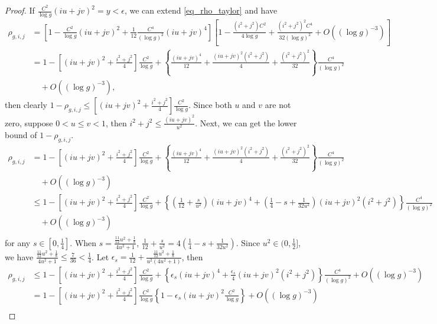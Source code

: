 \documentclass{article}
\begin{document}
\begin{appendices}
\begin{proof}
		If $\frac{C^2}{\log g}(iu+jv)^2=y<\epsilon$, we can extend \ref{eq_rho_taylor} and have
		\begin{equation*}
			\begin{aligned}
				\rho_{g,i,j}&= [1-\frac{C^2}{\log g}(iu+jv)^2+\frac{1}{12}\frac{C^4}{(\log g)^2}(iu+jv)^4][1-\frac{(i^2+j^2)C^2}{4\log g}+\frac{(i^2+j^2)^2C^4}{32(\log g)^2}+O((\log g)^{-3})]\\
				&=1-[(iu+jv)^2+\frac{i^2+j^2}{4}]\frac{C^2}{\log g}+\left\{\frac{(iu+jv)^4}{12}+\frac{(iu+jv)^2(i^2+j^2)}{4}+\frac{(i^2+j^2)^2}{32}\right\}\frac{C^4}{(\log g)^2}\\
				&\quad+O((\log g)^{-3}),
			\end{aligned}
		\end{equation*}
		then clearly $1-\rho_{g,i,j}\leq[(iu+jv)^2+\frac{i^2+j^2}{4}]\frac{C^2}{\log g}$. Since both $u$ and $v$ are not zero, suppose $0<u\leq v<1$, then $i^2+j^2\leq\frac{(iu+jv)^2}{u^2}$. Next, we can get the lower bound of $1-\rho_{g,i,j}$.
		\begin{equation*}
			\begin{aligned}
				\rho_{g,i,j}&=1-[(iu+jv)^2+\frac{i^2+j^2}{4}]\frac{C^2}{\log g}+\left\{\frac{(iu+jv)^4}{12}+\frac{(iu+jv)^2(i^2+j^2)}{4}+\frac{(i^2+j^2)^2}{32}\right\}\frac{C^4}{(\log g)^2}\\
				&\quad+O((\log g)^{-3})\\
				&\leq1-[(iu+jv)^2+\frac{i^2+j^2}{4}]\frac{C^2}{\log g}+\left\{(\frac{1}{12}+\frac{s}{u^2})(iu+jv)^4+(\frac{1}{4}-s+\frac{1}{32u^2})(iu+jv)^2(i^2+j^2)\right\}\frac{C^4}{(\log g)^2}\\
				&\quad+O((\log g)^{-3})\\
			\end{aligned}
		\end{equation*}
		for any $s\in[0,\frac{1}{4}]$. When $s=\frac{\frac{11}{12}u^2+\frac{1}{8}}{4u^2+1}$, $\frac{1}{12}+\frac{s}{u^2}=4(\frac{1}{4}-s+\frac{1}{32u^2})$. Since $u^2\in(0,\frac{1}{2}]$, we have $\frac{\frac{11}{12}u^2+\frac{1}{8}}{4u^2+1}\leq\frac{7}{36}<\frac{1}{4}$. Let $\epsilon_s=\frac{1}{12}+\frac{\frac{11}{12}u^2+\frac{1}{8}}{u^2(4u^2+1)}$, then
		\begin{equation*}
			\begin{aligned}
				\rho_{g,i,j} &\leq1-[(iu+jv)^2+\frac{i^2+j^2}{4}]\frac{C^2}{\log g}+\left\{\epsilon_s(iu+jv)^4+\frac{\epsilon_s}{4}(iu+jv)^2(i^2+j^2)\right\}\frac{C^4}{(\log g)^2}+O((\log g)^{-3})\\
				&=1-[(iu+jv)^2+\frac{i^2+j^2}{4}]\frac{C^2}{\log g}\left\{1-\epsilon_s(iu+jv)^2\frac{C^2}{\log g}\right\}+O((\log g)^{-3})\\

\end{aligned}
\end{equation*}
\end{proof}
\end{appendices}
\end{document}
